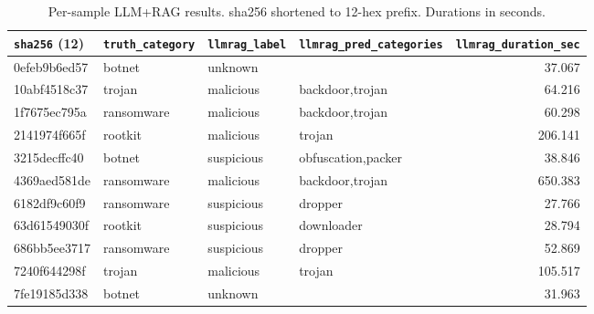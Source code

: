 \begin{table}[htbp]
      \centering
      \scriptsize
      \caption{Per-sample LLM+RAG results. sha256 shortened to 12-hex prefix. Durations in seconds.}
      \label{tab:per-sample-results-llmrag}
      \begin{tabular}{l l l l r}
            \hline
            \texttt{sha256} (12) & \texttt{truth\_category} & \texttt{llmrag\_label} & \texttt{llmrag\_pred\_categories} & \texttt{llmrag\_duration\_sec} \\
            \hline
            0efeb9b6ed57         & botnet                   & unknown                &                                   & 37.067                         \\
            10abf4518c37         & trojan                   & malicious              & backdoor,trojan                   & 64.216                         \\
            1f7675ec795a         & ransomware               & malicious              & backdoor,trojan                   & 60.298                         \\
            2141974f665f         & rootkit                  & malicious              & trojan                            & 206.141                        \\
            3215decffc40         & botnet                   & suspicious             & obfuscation,packer                & 38.846                         \\
            4369aed581de         & ransomware               & malicious              & backdoor,trojan                   & 650.383                        \\
            6182df9c60f9         & ransomware               & suspicious             & dropper                           & 27.766                         \\
            63d61549030f         & rootkit                  & suspicious             & downloader                        & 28.794                         \\
            686bb5ee3717         & ransomware               & suspicious             & dropper                           & 52.869                         \\
            7240f644298f         & trojan                   & malicious              & trojan                            & 105.517                        \\
            7fe19185d338         & botnet                   & unknown                &                                   & 31.963                         \\

\end{tabular}
\end{table}
